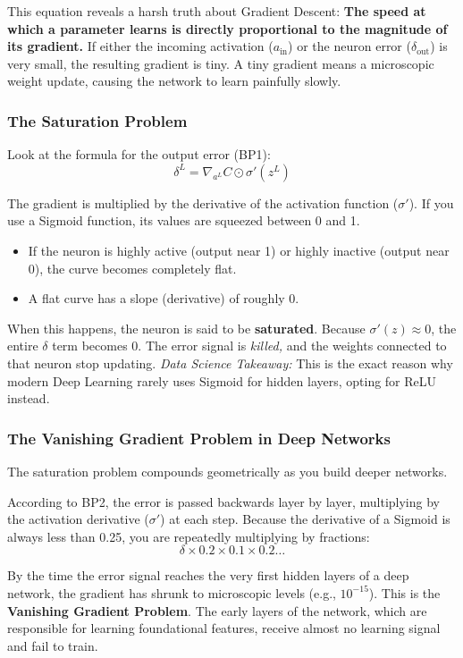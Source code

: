 \documentclass[11pt]{article}
\theoremstyle{smallexample}
\begin{document}
This equation reveals a harsh truth about Gradient Descent: \textbf{The speed at which a parameter learns is directly proportional to the magnitude of its gradient.} If either the incoming activation ($a_{\text{in}}$) or the neuron error ($\delta_{\text{out}}$) is very small, the resulting gradient is tiny. A tiny gradient means a microscopic weight update, causing the network to learn painfully slowly.

\subsubsection{The Saturation Problem}
Look at the formula for the output error (BP1): 
\[ \delta^L = \nabla_{a^L} C \odot \sigma'(z^L) \]

The gradient is multiplied by the derivative of the activation function ($\sigma'$). If you use a Sigmoid function, its values are squeezed between 0 and 1. 
\begin{itemize}
    \item If the neuron is highly active (output near 1) or highly inactive (output near 0), the curve becomes completely flat.
    \item A flat curve has a slope (derivative) of roughly $0$.
\end{itemize}
When this happens, the neuron is said to be \textbf{saturated}. Because $\sigma'(z) \approx 0$, the entire $\delta$ term becomes $0$. The error signal is \textit{killed,} and the weights connected to that neuron stop updating. \textit{Data Science Takeaway:} This is the exact reason why modern Deep Learning rarely uses Sigmoid for hidden layers, opting for ReLU instead.

\subsubsection{The Vanishing Gradient Problem in Deep Networks}
The saturation problem compounds geometrically as you build deeper networks. 

According to BP2, the error is passed backwards layer by layer, multiplying by the activation derivative ($\sigma'$) at each step. Because the derivative of a Sigmoid is always less than 0.25, you are repeatedly multiplying by fractions:
\[ \delta \times 0.2 \times 0.1 \times 0.2 \dots \]

By the time the error signal reaches the very first hidden layers of a deep network, the gradient has shrunk to microscopic levels (e.g., $10^{-15}$). This is the \textbf{Vanishing Gradient Problem}. The early layers of the network, which are responsible for learning foundational features, receive almost no learning signal and fail to train.
\end{document}
